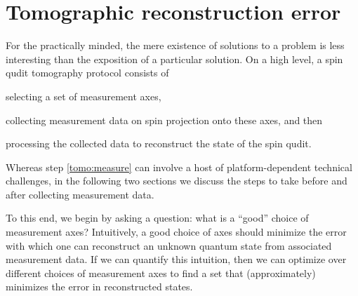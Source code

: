 \documentclass[notitlepage,twocolumn]{revtex4-2}
\newcommand{\1}{\mathds{1}}
\begin{document}
\section{Tomographic reconstruction error}
\label{sec:bound}

For the practically minded, the mere existence of solutions to a problem is less interesting than the exposition of a particular solution.
On a high level, a spin qudit tomography protocol consists of
\begin{enumerate*}
\item selecting a set of measurement axes,
\item collecting measurement data on spin projection onto these axes, and then
  \label{tomo:measure}
\item processing the collected data to reconstruct the state of the spin qudit.
\end{enumerate*}
Whereas step \ref{tomo:measure} can involve a host of platform-dependent technical challenges, in the following two sections we discuss the steps to take before and after collecting measurement data.

To this end, we begin by asking a question: what is a ``good'' choice of measurement axes?
Intuitively, a good choice of axes should minimize the error with which one can reconstruct an unknown quantum state from associated measurement data.
If we can quantify this intuition, then we can optimize over different choices of measurement axes to find a set that (approximately) minimizes the error in reconstructed states.
\end{document}
